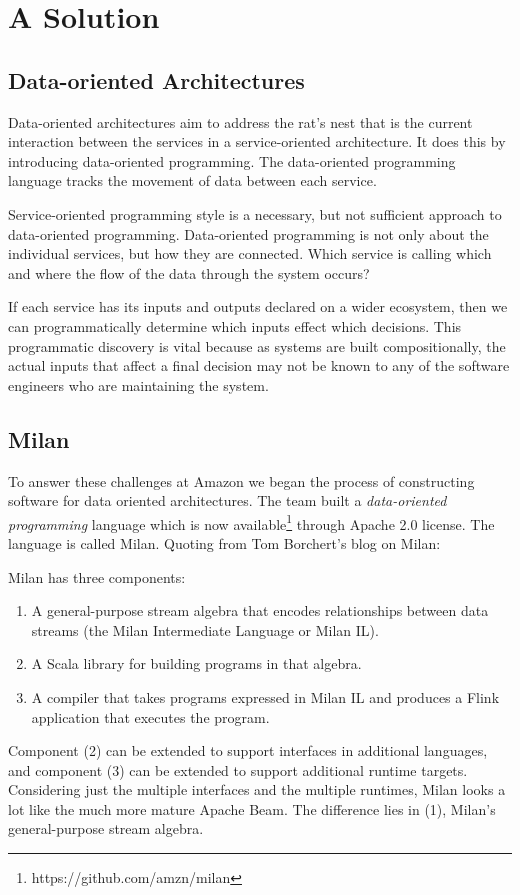 \documentclass[a4paper]{caesar_book}
\begin{document}
\section{A Solution}

\subsection{Data-oriented Architectures}

Data-oriented architectures aim to address the rat’s nest that is the current interaction between the services in a service-oriented architecture. It does this by introducing data-oriented programming. The data-oriented programming language tracks the movement of data between each service.

Service-oriented programming style is a necessary, but not sufficient approach to data-oriented programming. Data-oriented programming is not only about the individual services, but how they are connected. Which service is calling which and where the flow of the data through the system occurs?

If each service has its inputs and outputs declared on a wider ecosystem, then we can programmatically determine which inputs effect which decisions. This programmatic discovery is vital because as systems are built compositionally, the actual inputs that affect a final decision may not be known to any of the software engineers who are maintaining the system.

\subsection{Milan}

To answer these challenges at Amazon we began the process of constructing software for data oriented architectures. The team built a \textit{data-oriented programming} language which is now available\footnote{https://github.com/amzn/milan} through Apache 2.0 license. The language is called Milan. Quoting from Tom Borchert’s blog on Milan:

\begin{displayquote}
Milan has three components:

\begin{enumerate}
    \item A general-purpose stream algebra that encodes relationships between data streams (the Milan Intermediate Language or Milan IL).
    \item A Scala library for building programs in that algebra.
    \item A compiler that takes programs expressed in Milan IL and produces a Flink application that executes the program.
\end{enumerate}
        
Component (2) can be extended to support interfaces in additional languages, and component (3) can be extended to support additional runtime targets. Considering just the multiple interfaces and the multiple runtimes, Milan looks a lot like the much more mature Apache Beam. The difference lies in (1), Milan’s general-purpose stream algebra.
\end{displayquote}
\end{document}
